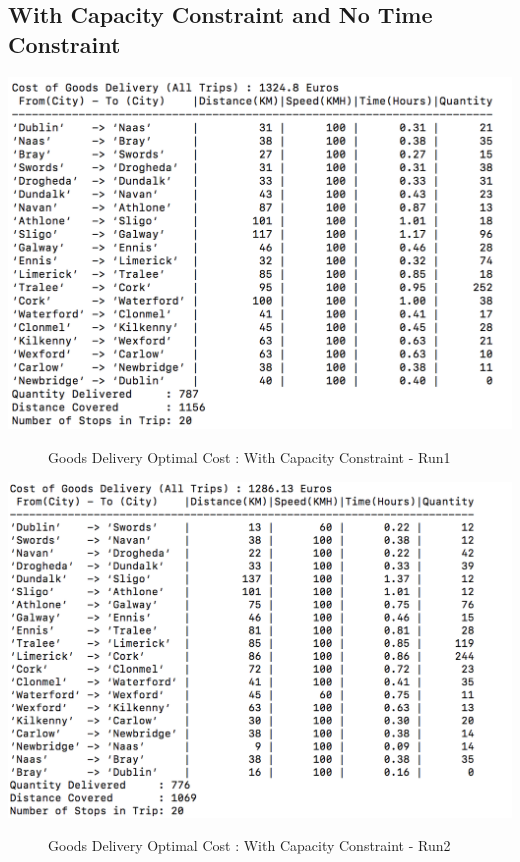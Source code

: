 \documentclass[a4paper&11pt]{article}
\begin{document}
\subsection*{With Capacity Constraint and No Time Constraint}

\begin{center}
\includegraphics[scale=0.8]{20fig1.png}
\begin{figure}[H]
\caption{Goods Delivery Optimal Cost :  With Capacity Constraint - Run1}
\label{fig:20fig1}
\end{figure}
\end{center}


\begin{center}
\includegraphics[scale=0.8]{20fig2.png}
\begin{figure}[H]
\caption{Goods Delivery Optimal Cost :  With Capacity Constraint - Run2}
\label{fig:20fig2}
\end{figure}
\end{center}
\end{document}

